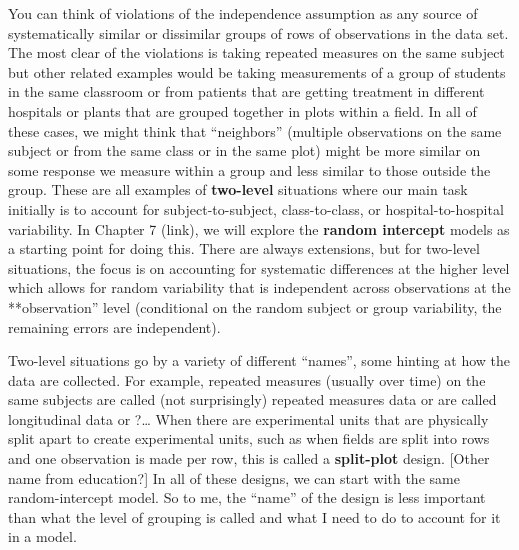 \documentclass[
]{book}
\begin{document}
\indent You can think of violations of the independence assumption as any source of systematically similar or dissimilar groups of rows of observations in the data set. The most clear of the violations is taking repeated measures on the same subject but other related examples would be taking measurements of a group of students in the same classroom or from patients that are getting treatment in different hospitals or plants that are grouped together in plots within a field. In all of these cases, we might think that ``neighbors'' (multiple observations on the same subject or from the same class or in the same plot) might be more similar on some response we measure within a group and less similar to those outside the group. These are all examples of \textbf{two-level} situations where our main task initially is to account for subject-to-subject, class-to-class, or hospital-to-hospital variability. In Chapter 7 (link), we will explore the \textbf{random intercept} models as a starting point for doing this. There are always extensions, but for two-level situations, the focus is on accounting for systematic differences at the higher level which allows for random variability that is independent across observations at the **observation'' level (conditional on the random subject or group variability, the remaining errors are independent).

Two-level situations go by a variety of different ``names'', some hinting at how the data are collected. For example, repeated measures (usually over time) on the same subjects are called (not surprisingly) repeated measures data or are called longitudinal data or ?\ldots{} When there are experimental units that are physically split apart to create experimental units, such as when fields are split into rows and one observation is made per row, this is called a \textbf{split-plot} design. {[}Other name from education?{]} In all of these designs, we can start with the same random-intercept model. So to me, the ``name'' of the design is less important than what the level of grouping is called and what I need to do to account for it in a model.
\end{document}
